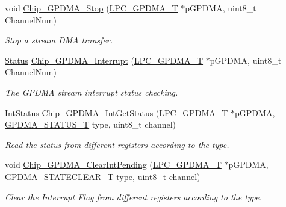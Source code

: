 \begin{DoxyCompactItemize}
void \hyperlink{group___g_p_d_m_a__18_x_x__43_x_x_gafa887387f85205ecacc3220700b49d0d}{Chip\+\_\+\+G\+P\+D\+M\+A\+\_\+\+Stop} (\hyperlink{struct_l_p_c___g_p_d_m_a___t}{L\+P\+C\+\_\+\+G\+P\+D\+M\+A\+\_\+T} $\ast$p\+G\+P\+D\+MA, uint8\+\_\+t Channel\+Num)
\begin{DoxyCompactList}\small\item\em Stop a stream D\+MA transfer. \end{DoxyCompactList}\item 
\hyperlink{group___l_p_c___types___public___types_ga67a0db04d321a74b7e7fcfd3f1a3f70b}{Status} \hyperlink{group___g_p_d_m_a__18_x_x__43_x_x_ga986bb4a0d10a05ff6284fff871fb86c6}{Chip\+\_\+\+G\+P\+D\+M\+A\+\_\+\+Interrupt} (\hyperlink{struct_l_p_c___g_p_d_m_a___t}{L\+P\+C\+\_\+\+G\+P\+D\+M\+A\+\_\+T} $\ast$p\+G\+P\+D\+MA, uint8\+\_\+t Channel\+Num)
\begin{DoxyCompactList}\small\item\em The G\+P\+D\+MA stream interrupt status checking. \end{DoxyCompactList}\item 
\hyperlink{group___l_p_c___types___public___types_gab7d263072f745b4f3913fb0afc434c4e}{Int\+Status} \hyperlink{group___g_p_d_m_a__18_x_x__43_x_x_ga06fdae68a49436b9a02d42ad85782ff4}{Chip\+\_\+\+G\+P\+D\+M\+A\+\_\+\+Int\+Get\+Status} (\hyperlink{struct_l_p_c___g_p_d_m_a___t}{L\+P\+C\+\_\+\+G\+P\+D\+M\+A\+\_\+T} $\ast$p\+G\+P\+D\+MA, \hyperlink{group___g_p_d_m_a__18_x_x__43_x_x_ga2f4aa97bd0ffa5046c8e2b17028d99cc}{G\+P\+D\+M\+A\+\_\+\+S\+T\+A\+T\+U\+S\+\_\+T} type, uint8\+\_\+t channel)
\begin{DoxyCompactList}\small\item\em Read the status from different registers according to the type. \end{DoxyCompactList}\item 
void \hyperlink{group___g_p_d_m_a__18_x_x__43_x_x_ga94c9bdb806ce700f0c04deeec0da142e}{Chip\+\_\+\+G\+P\+D\+M\+A\+\_\+\+Clear\+Int\+Pending} (\hyperlink{struct_l_p_c___g_p_d_m_a___t}{L\+P\+C\+\_\+\+G\+P\+D\+M\+A\+\_\+T} $\ast$p\+G\+P\+D\+MA, \hyperlink{group___g_p_d_m_a__18_x_x__43_x_x_gabbb281ef4b818f2e60167cf766f94fdb}{G\+P\+D\+M\+A\+\_\+\+S\+T\+A\+T\+E\+C\+L\+E\+A\+R\+\_\+T} type, uint8\+\_\+t channel)
\begin{DoxyCompactList}\small\item\em Clear the Interrupt Flag from different registers according to the type. \end{DoxyCompactList}\item 

\end{DoxyCompactItemize}
